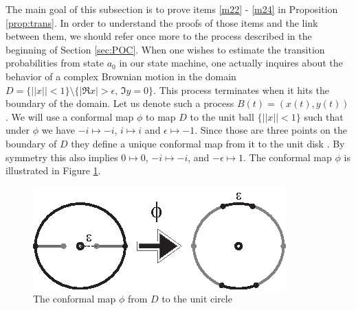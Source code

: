 {The main goal of this subsection is to prove items \ref{m22} - \ref{m24} in Proposition
 \ref{prop:trans}. In order to understand the proofs of those items and the link
  between them, we should refer once more to the process described in the
   beginning of Section \ref{sec:POC}. When one wishes to estimate the
   transition probabilities from state $a_0$ in our state machine, one
   actually inquires about the behavior of a complex Brownian motion in
   the domain $D=\{||x||<1\}\setminus\{|\Re x|>\epsilon,\,\Im y=0\}$. This
   process terminates when it hits the boundary of the domain. Let us
   denote such a process $B(t)=(x(t),y(t))$. We will use a conformal
    map $\phi$ to map $D$ to the unit ball $\{||x||<1\}$ such that
    under $\phi$ we have $-i \mapsto-i$, $i\mapsto i$ and
    $\epsilon\mapsto-1$. Since those are three points on the
     boundary of $D$ they define a unique conformal map from it
      to the unit disk . By symmetry
      this also implies $0\mapsto0$, $-i\mapsto -i$, and
       $-\epsilon\mapsto1$. The conformal map $\phi$ is
       illustrated in Figure \ref{fig:conf_map}.
\begin{figure}[htb]
\begin{center}
\leavevmode
\includegraphics{conformal_map.eps}
\end{center}
\caption{The conformal map $\phi$ from $D$ to the unit circle}
\label{fig:conf_map}
\end{figure}

}
